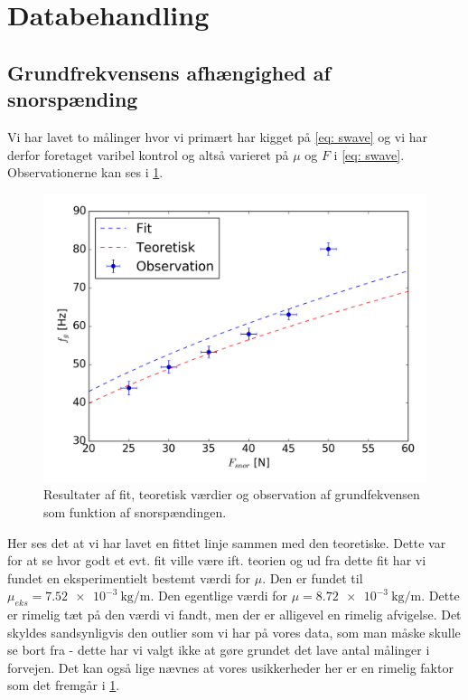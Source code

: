 \documentclass[A2_main.tex]{subfiles}
\begin{document}
\section{Databehandling}
\subsection{Grundfrekvensens afhængighed af snorspænding}
Vi har lavet to målinger hvor vi primært har kigget på \cref{eq: swave} og vi har derfor foretaget varibel kontrol og altså varieret på $\mu$ og $F$ i \cref{eq: swave}. Observationerne kan ses i \cref{fig:frekvensSNor}.
\begin{figure}[H]
    \includegraphics[width=\linewidth]{frekvensSnorSpaending.png}
    \caption{Resultater af fit, teoretisk værdier og observation af grundfekvensen som funktion af snorspændingen.}
    \label{fig:frekvensSNor}
\end{figure}

Her ses det at vi har lavet en fittet linje sammen med den teoretiske. Dette var for at se hvor godt et evt. fit ville være ift. teorien og ud fra dette fit har vi fundet en eksperimentielt bestemt værdi for $\mu$. Den er fundet til $\mu_{eks}=\SI{7.52e-3}{\kg\per\m}$. Den egentlige værdi for $\mu=\SI{8.72e-3}{\kg\per\m}$. Dette er rimelig tæt på den værdi vi fandt, men der er alligevel en rimelig afvigelse. Det skyldes sandsynligvis den outlier som vi har på vores data, som man måske skulle se bort fra - dette har vi valgt ikke at gøre grundet det lave antal målinger i forvejen. Det kan også lige nævnes at vores usikkerheder her er en rimelig faktor som det fremgår i \cref{fig:frekvensSNor}.
\end{document}
